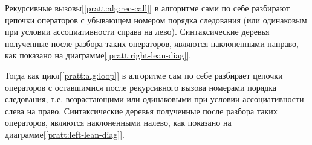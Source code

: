 Рекурсивные вызовы[\ref{pratt:alg:rec-call}] в алгоритме сами по себе разбирают цепочки операторов с убывающем номером порядка следования
(или одинаковым при условии ассоциативности справа на лево). 
Синтаксические деревья полученные после разбора таких операторов, являются наклоненными направо, как показано на диаграмме[\ref{pratt:right-lean-diag}].

Тогда как цикл[\ref{pratt:alg:loop}] в алгоритме сам по себе разбирает цепочки операторов с оставшимися после рекурсивного вызова номерами порядка следования, 
т.е. возрастающими или одинаковыми при условии ассоциативности слева на право. 
Синтаксические деревья полученные после разбора таких операторов, являются наклоненными налево, как показано на диаграмме[\ref{pratt:left-lean-diag}].






